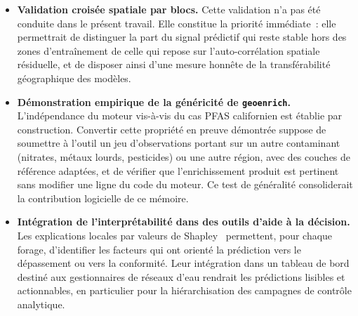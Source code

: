 \begin{itemize}

    \item \textbf{Validation crois\'ee spatiale par blocs.} Cette validation n'a pas \'et\'e conduite dans le pr\'esent travail. Elle constitue la priorit\'e imm\'ediate~: elle permettrait de distinguer la part du signal pr\'edictif qui reste stable hors des zones d'entra\^inement de celle qui repose sur l'auto-corr\'elation spatiale r\'esiduelle, et de disposer ainsi d'une mesure honn\^ete de la transf\'erabilit\'e g\'eographique des mod\`eles.

    \item \textbf{D\'emonstration empirique de la g\'en\'ericit\'e de \texttt{geoenrich}.} L'ind\'ependance du moteur vis-\`a-vis du cas PFAS californien est \'etablie par construction. Convertir cette propri\'et\'e en preuve d\'emontr\'ee suppose de soumettre \`a l'outil un jeu d'observations portant sur un autre contaminant (nitrates, m\'etaux lourds, pesticides) ou une autre r\'egion, avec des couches de r\'ef\'erence adapt\'ees, et de v\'erifier que l'enrichissement produit est pertinent sans modifier une ligne du code du moteur. Ce test de g\'en\'eralit\'e consoliderait la contribution logicielle de ce m\'emoire.

    \item \textbf{Int\'egration de l'interpr\'etabilit\'e dans des outils d'aide \`a la d\'ecision.} Les explications locales par valeurs de Shapley~\cite{lundberg2017shap} permettent, pour chaque forage, d'identifier les facteurs qui ont orient\'e la pr\'ediction vers le d\'epassement ou vers la conformit\'e. Leur int\'egration dans un tableau de bord destin\'e aux gestionnaires de r\'eseaux d'eau rendrait les pr\'edictions lisibles et actionnables, en particulier pour la hi\'erarchisation des campagnes de contr\^ole analytique.


\end{itemize}
